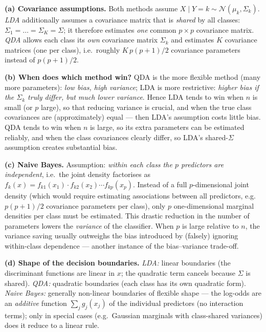 \documentclass[11pt,a4paper]{article}
\begin{document}
\ifdefined\withsolutions
\begin{solutionbox}
\textbf{(a) Covariance assumptions.}
Both methods assume $X\mid Y=k\sim\mathcal{N}(\mu_k,\Sigma_k)$.
\emph{LDA} additionally assumes a covariance matrix that is \emph{shared} by all classes:
$\Sigma_1=\dots=\Sigma_K=\Sigma$; it therefore estimates \emph{one} common $p\times p$
covariance matrix. \emph{QDA} allows each class its \emph{own} covariance matrix
$\Sigma_k$ and estimates $K$ covariance matrices (one per class), i.e.\ roughly
$K\,p(p+1)/2$ covariance parameters instead of $p(p+1)/2$.

\medskip
\textbf{(b) When does which method win?}
QDA is the more flexible method (many more parameters): \emph{low bias, high variance};
LDA is more restrictive: \emph{higher bias if the $\Sigma_k$ truly differ, but much lower
variance}. Hence LDA tends to win when $n$ is small (or $p$ large), so that reducing
variance is crucial, and when the true class covariances are (approximately) equal ---
then LDA's assumption costs little bias. QDA tends to win when $n$ is large, so its extra
parameters can be estimated reliably, and when the class covariances clearly differ, so
LDA's shared-$\Sigma$ assumption creates substantial bias.

\medskip
\textbf{(c) Naive Bayes.}
Assumption: \emph{within each class the $p$ predictors are independent}, i.e.\ the joint
density factorises as $f_k(x)=f_{k1}(x_1)\cdot f_{k2}(x_2)\cdots f_{kp}(x_p)$.
Instead of a full $p$-dimensional joint density (which would require estimating
associations between all predictors, e.g.\ $p(p+1)/2$ covariance parameters per class),
only $p$ one-dimensional marginal densities per class must be estimated. This drastic
reduction in the number of parameters lowers the \emph{variance} of the classifier.
When $p$ is large relative to $n$, the variance saving usually outweighs the bias
introduced by (falsely) ignoring within-class dependence --- another instance of the
bias--variance trade-off.

\medskip
\textbf{(d) Shape of the decision boundaries.}
\emph{LDA:} linear boundaries (the discriminant functions are linear in $x$; the quadratic
term cancels because $\Sigma$ is shared). \emph{QDA:} quadratic boundaries (each class has
its own quadratic form). \emph{Naive Bayes:} generally non-linear boundaries of flexible
shape --- the log-odds are an \emph{additive} function $\sum_j g_j(x_j)$ of the individual
predictors (no interaction terms); only in special cases (e.g.\ Gaussian marginals with
class-shared variances) does it reduce to a linear rule.
\end{solutionbox}
\fi
\end{document}
